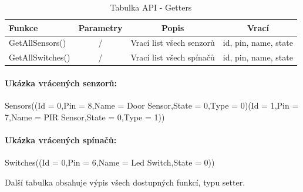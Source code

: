 \documentclass[FM,DP]{tulthesis}  %
\begin{document}
\renewcommand{\arraystretch}{1.5}
\begin{table}[H]
\begin{center}
\begin{tabular}{| l | c | c| c |}
\hline
Funkce & Parametry & Popis & Vrací\\
\hline
\hline
GetAllSensors() & / & Vrací list všech senzorů & id, pin, name, state \\
\hline
GetAllSwitches() & / & Vrací list všech spínačů & id, pin, name, state \\
\hline
\end{tabular}
\end{center}
\caption{Tabulka API - Getters}
\end{table}

\paragraph{Ukázka vrácených senzorů:}
\begin{center}
Sensors((Id = 0,Pin = 8,Name = Door Sensor,State = 0,Type = 0)(Id = 1,Pin = 7,Name = PIR Sensor,State = 0,Type = 1))
\end{center} 

\paragraph{Ukázka vrácených spínačů:}
\begin{center}
Switches((Id = 0,Pin = 6,Name = Led Switch,State = 0))
\end{center} 

Další tabulka obsahuje výpis všech dostupných funkcí, typu setter.
\end{document}

